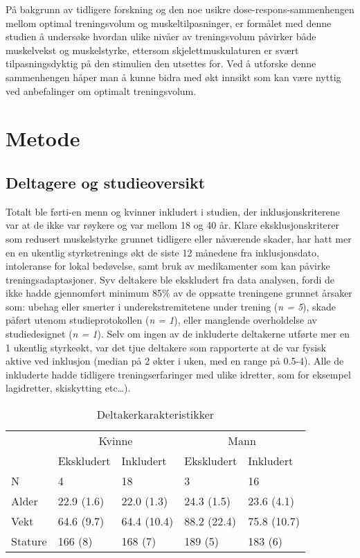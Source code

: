 \documentclass[
  letterpaper,
  DIV=11,
  numbers=noendperiod]{scrreprt}
\begin{document}
På bakgrunn av tidligere forskning og den noe usikre
dose-respons-sammenhengen mellom optimal treningsvolum og
muskeltilpasninger, er formålet med denne studien å undersøke hvordan
ulike nivåer av treningsvolum påvirker både muskelvekst og muskelstyrke,
ettersom skjelettmuskulaturen er svært tilpasningsdyktig på den
stimulien den utsettes for. Ved å utforske denne sammenhengen håper man
å kunne bidra med økt innsikt som kan være nyttig ved anbefalinger om
optimalt treningsvolum.


\chapter{Metode}\label{metode-5}

\section{Deltagere og studieoversikt}\label{deltagere-og-studieoversikt}

Totalt ble førti-en menn og kvinner inkludert i studien, der
inklusjonskriterene var at de ikke var røykere og var mellom 18 og 40
år. Klare eksklusjonskriterer som redusert muskelstyrke grunnet
tidligere eller nåværende skader, har hatt mer en en ukentlig
styrketrenings økt de siste 12 månedene fra inklusjonsdato, intoleranse
for lokal bedøvelse, samt bruk av medikamenter som kan påvirke
treningsadaptasjoner. Syv deltakere ble ekskludert fra data analysen,
fordi de ikke hadde gjennomført minimum 85\% av de oppsatte treningene
grunnet årsaker som: ubehag eller smerter i underekstremitetene under
trening (\emph{n = 5}), skade påført utenom studieprotokollen (\emph{n =
1}), eller manglende overholdelse av studiedesignet (\emph{n = 1}). Selv
om ingen av de inkluderte deltakerne utførte mer en 1 ukentlig
styrkeøkt, var det tjue deltakere som rapporterte at de var fysisk
aktive ved inklusjon (median på 2 økter i uken, med en range på 0.5-4).
Alle de inkluderte hadde tidligere treningserfaringer med ulike
idretter, som for eksempel lagidretter, skiskytting etc\ldots).

\begin{longtable}[t]{lllll}

\caption{\label{tbl-antro}Deltakerkarakteristikker}

\tabularnewline

\toprule
\multicolumn{1}{c}{ } & \multicolumn{2}{c}{Kvinne} & \multicolumn{2}{c}{Mann} \\
\cmidrule(l{3pt}r{3pt}){2-3} \cmidrule(l{3pt}r{3pt}){4-5}
 & Ekskludert & Inkludert & Ekskludert & Inkludert\\
\midrule
N & 4 & 18 & 3 & 16\\
Alder & 22.9 (1.6) & 22.0 (1.3) & 24.3 (1.5) & 23.6 (4.1)\\
Vekt & 64.6 (9.7) & 64.4 (10.4) & 88.2 (22.4) & 75.8 (10.7)\\
Stature & 166 (8) & 168 (7) & 189 (5) & 183 (6)\\
\bottomrule

\end{longtable}
\end{document}
